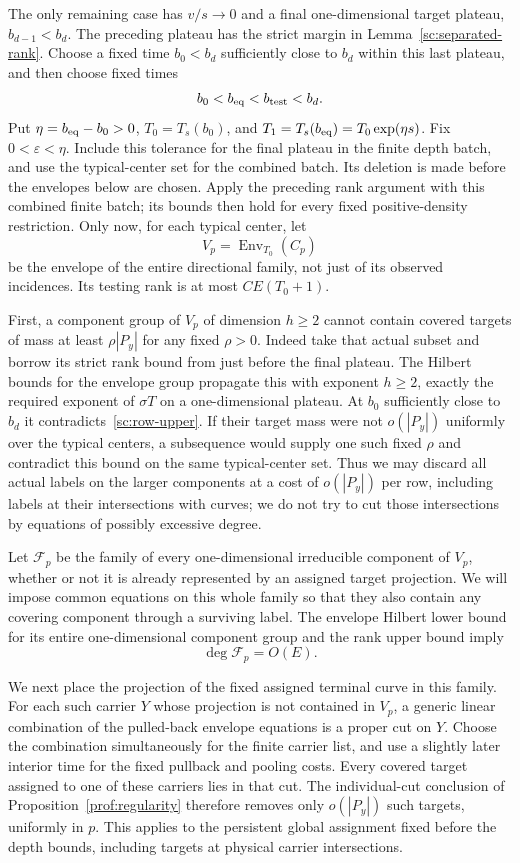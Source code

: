 The only remaining case has $v/s\to0$ and a final
one-dimensional target plateau, $b_{d-1}<b_d$.  The
preceding plateau has the strict margin in
Lemma~\ref{sc:separated-rank}.  Choose a fixed time $b_0<b_d$ sufficiently
close to $b_d$ within this last plateau, and then choose fixed times
\[
 b_0<b_{\rm eq}<b_{\rm test}<b_d.
\]
Put $\eta=b_{\rm eq}-b_0>0$, $T_0=T_s(b_0)$, and
$T_1=T_s(b_{\rm eq})=T_0\exp(\eta s)$.  Fix $0<\varepsilon<\eta$.
Include this tolerance for the final plateau in the finite depth batch,
and use the typical-center set for the combined batch.  Its deletion is
made before the envelopes below are chosen.  Apply the preceding rank
argument with this combined finite batch; its bounds then hold for every
fixed positive-density restriction.  Only now, for each typical center, let
\[
 V_p=\operatorname{Env}_{T_0}(C_p)
\]
be the envelope of the entire directional family, not
just of its observed incidences.  Its testing rank is
at most $CE(T_0+1)$.

First, a component group of $V_p$ of dimension $h\ge2$
cannot contain covered targets of mass at least $\rho|P_y|$ for any
fixed $\rho>0$.  Indeed take that actual subset and borrow its strict rank
bound from just before the final plateau.  The Hilbert bounds for
the envelope group propagate this with exponent
$h\ge2$, exactly the required exponent of $\sigma T$
on a one-dimensional plateau.  At $b_0$ sufficiently
close to $b_d$ it contradicts~\eqref{sc:row-upper}.
If their target mass were not $o(|P_y|)$ uniformly over the typical
centers, a subsequence would supply one such fixed $\rho$ and contradict
this bound on the same typical-center set.  Thus we may discard all
actual labels on the larger components at a cost of $o(|P_y|)$ per row,
including labels at their intersections with curves;
we do not try to cut those intersections by equations
of possibly excessive degree.

Let $\mathcal F_p$ be the family of every one-dimensional irreducible
component of $V_p$, whether or not it is already represented by an
assigned target projection.  We will impose common equations on this
whole family so that they also contain any covering component through a
surviving label.  The envelope Hilbert lower bound for its entire
one-dimensional component group and the rank upper bound imply
\begin{equation}\label{sc:last-family-degree}
 \deg\mathcal F_p=O(E).
\end{equation}

We next place the projection of the fixed assigned terminal curve in
this family.  For each such carrier $Y$ whose projection is not contained
in $V_p$, a generic linear combination of the pulled-back envelope
equations is a proper cut on $Y$.  Choose the combination simultaneously
for the finite carrier list, and use a slightly later interior time for
the fixed pullback and pooling costs.  Every covered target assigned to
one of these carriers lies in that cut.  The individual-cut conclusion of
Proposition~\ref{prof:regularity} therefore removes only $o(|P_y|)$ such
targets, uniformly in $p$.  This applies to the persistent global
assignment fixed before the depth bounds, including targets at physical
carrier intersections.

